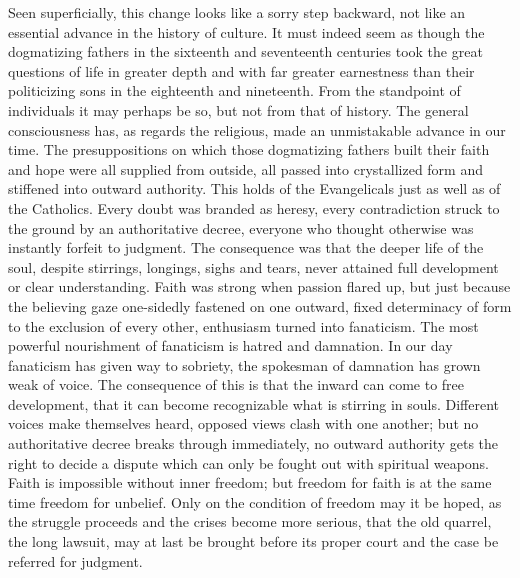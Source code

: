 \documentclass[12pt,a4paper,openany]{book}
\newcommand{\opage}[1]{\marginnote{\footnotesize\textit{[#1]}}}
\begin{document}
Seen superficially, this change looks like a sorry step backward, not like an essential advance in
the history of culture. It must indeed seem as though the dogmatizing fathers in the sixteenth and
seventeenth centuries took the great questions of life in greater depth and with far greater
earnestness than their politicizing sons in the eighteenth and nineteenth. From the standpoint of
individuals it may perhaps be so, but not from that of history. The general consciousness has, as
regards the religious, made an unmistakable advance in our time. The presuppositions on which those
dogmatizing fathers built their faith and hope were all supplied from outside, all passed into
crystallized form and stiffened into outward authority. This holds of the Evangelicals just as well
as of the Catholics. Every doubt was branded as heresy, every contradiction struck to the ground by an
authoritative decree, everyone who thought otherwise was instantly forfeit to judgment. The
consequence was that the deeper life of the soul, despite stirrings, longings, sighs and tears,
\setcounter{footnote}{0}%
\opage{14}never attained full development or clear understanding. Faith was strong when passion flared
up, but just because the believing gaze one-sidedly fastened on one outward, fixed determinacy of
form to the exclusion of every other, enthusiasm turned into fanaticism. The most powerful
nourishment of fanaticism is hatred and damnation. In our day fanaticism has given way to sobriety,
the spokesman of damnation has grown weak of voice. The consequence of this is that the inward can
come to free development, that it can become recognizable what is stirring in souls. Different
voices make themselves heard, opposed views clash with one another; but no authoritative decree
breaks through immediately, no outward authority gets the right to decide a dispute which can only
be fought out with spiritual weapons. Faith is impossible without inner freedom; but freedom for
faith is at the same time freedom for unbelief. Only on the condition of freedom may it be hoped, as
the struggle proceeds and the crises become more serious, that the old quarrel, the long lawsuit,
may at last be brought before its proper court and the case be referred for judgment.
\end{document}
